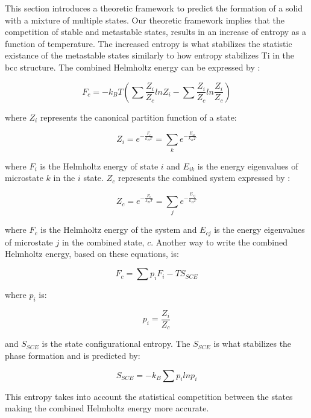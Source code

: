 
This section introduces a theoretic framework to predict the formation of a solid with a mixture of multiple states. Our theoretic framework implies that the competition of stable and metastable states, results in an increase of entropy as a function of temperature. The increased entropy is what stabilizes the statistic existance of the metastable states similarly to how entropy stabilizes Ti in the bcc structure. The combined Helmholtz energy can be expressed by \cite{Liu2016}:

\begin{equation}
\label{eq: combinedhelmholtz}
F_{c} = - k_{B} T \left( \sum \frac{Z_{i}}{Z_{c}} lnZ_{i} - \sum \frac{Z_{i}}{Z_{c}} ln \frac{Z_{i}}{Z_{c}}  \right) 
\end{equation}

\noindent where $Z_{i}$ represents the canonical partition function of a state:

\begin{equation}
\label{eq: zi}
Z_{i} = e^{- \frac{F_{i}}{k_{B}T}} = \sum_{k} e^{- \frac{E_{ik}}{k_{B}T}}
\end{equation}

\noindent where $F_{i}$ is the Helmholtz energy of state $i$ and $E_{ik}$ is the energy eigenvalues of microstate $k$ in the $i$ state. $Z_{c}$ represents the combined system expressed by \cite{Liu2017}:

\begin{equation}
\label{eq: zc}
Z_{c} = e^{-\frac{F_{c}}{k_{B}T}} = \sum_{j} e^{- \frac{E_{cj}}{k_{B}T}} 
\end{equation}

\noindent where $F_{c}$ is the Helmholtz energy of the system and $E_{cj}$ is the energy eigenvalues of microstate $j$ in the combined state, $c$. Another way to write the combined Helmholtz energy, based on these equations, is:

\begin{equation}
\label{eq: combinedhelmholtz2}
F_{c} = \sum p_{i} F_{i} - TS_{SCE}
\end{equation}

\noindent where $p_{i}$ is:

\begin{equation}
\label{pi}
p_{i} = \frac{Z_{i}}{Z_{c}}
\end{equation}

\noindent and $S_{SCE}$ is the state configurational entropy. The $S_{SCE}$ is what stabilizes the phase formation and is predicted by:

\begin{equation}
\label{SSCE}
S_{SCE} = -k_{B} \sum p_{i} lnp_{i}
\end{equation}

\noindent This entropy takes into account the statistical competition between the states making the combined Helmholtz energy more accurate.
